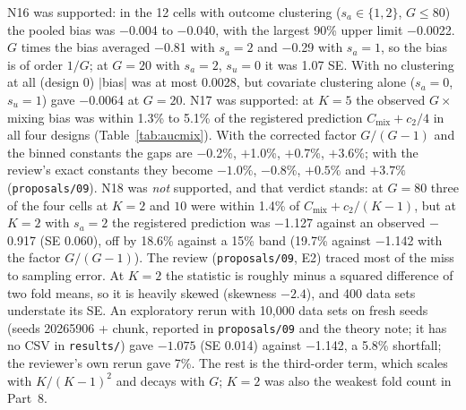\documentclass[11pt]{amsart}
\theoremstyle{plain}
\theoremstyle{definition}
\theoremstyle{remark}
\newcommand{\Cmix}{C_{\mathrm{mix}}}
\begin{document}
N16 was supported: in the 12 cells with outcome clustering ($s_a\in\{1,2\}$, $G\le80$) the pooled bias was $-$0.004 to $-$0.040, with the largest 90\% upper limit $-$0.0022. $G$ times the bias averaged $-$0.81 with $s_a=2$ and $-$0.29 with $s_a=1$, so the bias is of order $1/G$; at $G=20$ with $s_a=2$, $s_u=0$ it was 1.07 SE. With no clustering at all (design 0) $|$bias$|$ was at most 0.0028, but covariate clustering alone ($s_a=0$, $s_u=1$) gave $-$0.0064 at $G=20$. N17 was supported: at $K=5$ the observed $G\times$ mixing bias was within 1.3\% to 5.1\% of the registered prediction $\Cmix+c_2/4$ in all four designs (Table~\ref{tab:aucmix}). With the corrected factor $G/(G-1)$ and the binned constants the gaps are $-$0.2\%, $+$1.0\%, $+$0.7\%, $+$3.6\%; with the review's exact constants they become $-1.0\%$, $-0.8\%$, $+0.5\%$ and $+3.7\%$ (\texttt{proposals/09}). N18 was \emph{not} supported, and that verdict stands: at $G=80$ three of the four cells at $K=2$ and $10$ were within 1.4\% of $\Cmix+c_2/(K-1)$, but at $K=2$ with $s_a=2$ the registered prediction was $-$1.127 against an observed $-$0.917 (SE 0.060), off by 18.6\% against a 15\% band (19.7\% against $-$1.142 with the factor $G/(G-1)$). The review (\texttt{proposals/09}, E2) traced most of the miss to sampling error. At $K=2$ the statistic is roughly minus a squared difference of two fold means, so it is heavily skewed (skewness $-2.4$), and 400 data sets understate its SE. An exploratory rerun with 10,000 data sets on fresh seeds (seeds 20265906 + chunk, reported in \texttt{proposals/09} and the theory note; it has no CSV in \texttt{results/}) gave $-1.075$ (SE 0.014) against $-$1.142, a 5.8\% shortfall; the reviewer's own rerun gave 7\%. The rest is the third-order term, which scales with $K/(K-1)^2$ and decays with $G$; $K=2$ was also the weakest fold count in Part~8.
\end{document}

